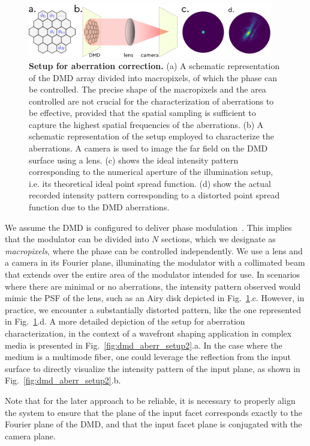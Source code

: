 \documentclass[12pt]{iopart}
\newcommand{\red}[1]{#1}
\begin{document}
\begin{figure}
  \centering
  \includegraphics[width = 0.95\textwidth]{images/DMD_abberations_setup.pdf}
  \caption{
    \textbf{Setup for aberration correction.}
    (a) A schematic representation of the DMD array divided into macropixels,
    of which the phase can be controlled.
    The precise shape of the macropixels and the area controlled are not crucial for the characterization of aberrations to be effective,
    provided that the spatial sampling is sufficient to capture the highest spatial frequencies of the aberrations.
    (b) A schematic representation of the setup employed to characterize the aberrations.
    A camera is used to image the far field on the DMD surface using a lens.
    (c) shows the ideal intensity pattern corresponding to the numerical aperture of the illumination setup,
    i.e. its theoretical ideal point spread function.
    (d) show the actual recorded intensity pattern corresponding to a distorted point spread function due to the DMD aberrations.
  }
  \label{fig:dmd_aberr_setup}
\end{figure}


We assume the DMD is configured to deliver phase modulation~\cite{lee1979binary,Gutierrez2024DMD}.
This implies that the modulator can be divided into $N$ sections,
which we designate as {\em macropixels},
where the phase can be controlled independently.
We use a lens and a camera in its Fourier plane,
illuminating the modulator with a collimated beam
that extends over the entire area of the modulator intended for use.
In scenarios where there are minimal or no aberrations,
the intensity pattern observed would mimic the PSF of the lens,
such as an Airy disk depicted in Fig.~\ref{fig:dmd_aberr_setup}.c.
However, in practice, we encounter a substantially distorted pattern,
like the one represented in Fig.~\ref{fig:dmd_aberr_setup}.d.
A more detailed depiction of the setup for aberration characterization,
in the context of a wavefront shaping application in complex media is presented in Fig.~\ref{fig:dmd_aberr_setup2}.a.
In the case where the medium is a multimode fiber,
one could leverage the reflection from the input surface
to directly visualize the intensity pattern of the input plane,
as shown in Fig.~\ref{fig:dmd_aberr_setup2}.b. 
\red{
Note that for the later approach to be reliable, it is necessary to properly align the system to ensure that the plane of the input facet corresponds exactly to the Fourier plane of the DMD, and that the input facet plane is conjugated with the camera plane.
}
\\
\end{document}
